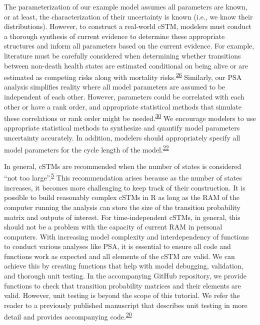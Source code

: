 \documentclass[
]{article}
\begin{document}
The parameterization of our example model assumes all parameters are known, or at least, the characterization of their uncertainty is known (i.e., we know their distributions). However, to construct a real-world cSTM, modelers must conduct a thorough synthesis of current evidence to determine these appropriate structures and inform all parameters based on the current evidence. For example, literature must be carefully considered when determining whether transitions between non-death health states are estimated conditional on being alive or are estimated as competing risks along with mortality risks.\textsuperscript{\protect\hyperlink{ref-Briggs2012}{26}} Similarly, our PSA analysis simplifies reality where all model parameters are assumed to be independent of each other. However, parameters could be correlated with each other or have a rank order, and appropriate statistical methods that simulate these correlations or rank order might be needed.\textsuperscript{\protect\hyperlink{ref-Goldhaber-Fiebert2015}{30}} We encourage modelers to use appropriate statistical methods to synthesize and quantify model parameters uncertainty accurately. In addition, modelers should appropriately specify all model parameters for the cycle length of the model.\textsuperscript{\protect\hyperlink{ref-Hunink2014}{22}}

In general, cSTMs are recommended when the number of states is considered ``not too large''.\textsuperscript{\protect\hyperlink{ref-Siebert2012c}{5}} This recommendation arises because as the number of states increases, it becomes more challenging to keep track of their construction. It is possible to build reasonably complex cSTMs in R as long as the RAM of the computer running the analysis can store the size of the transition probability matrix and outputs of interest. For time-independent cSTMs, in general, this should not be a problem with the capacity of current RAM in personal computers. With increasing model complexity and interdependency of functions to conduct various analyses like PSA, it is essential to ensure all code and functions work as expected and all elements of the cSTM are valid. We can achieve this by creating functions that help with model debugging, validation, and thorough unit testing. In the accompanying GitHub repository, we provide functions to check that transition probability matrices and their elements are valid. However, unit testing is beyond the scope of this tutorial. We refer the reader to a previously published manuscript that describes unit testing in more detail and provides accompanying code.\textsuperscript{\protect\hyperlink{ref-Alarid-Escudero2019e}{20}}
\end{document}
